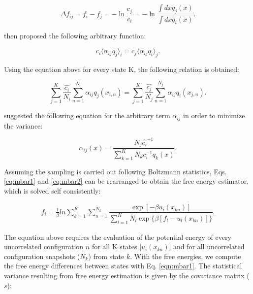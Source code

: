 \begin{equation}
\Delta f_{ij} = f_{i} - f_{j} = - \ln \frac{c_{j}}{c_{i}}  = -\ln \frac{\int dx q_{j}(x)}{\int dx q_{i}(x)} .
\label{eqn:mbar1}
\end{equation}

 then proposed the following arbitrary function:

\begin{equation}
c_{i} \langle \alpha _{ij} q_{j} \rangle _{i}  =  c_{j} \langle \alpha _{ij} q_{i} \rangle _{j} .
\end{equation}

Using the equation above for every state  K, the following relation is obtained:

\begin{equation}
\label{eq:mbar1}
\sum_{j=1}^{K} \frac{\hat{c_{i}}}{N_{i}} \sum_{n=1}^{N_{i}} \alpha _{ij} q_{j} (x_{i,n}) =  \sum_{j=1}^{K} \frac{\hat{c_{j}}}{N_{j}} \sum_{n=1}^{N_{j}} \alpha _{ij} q_{i} (x_{j,n}) .
\end{equation}

 suggested the following equation for the arbitrary term $\alpha _{ij}$ in order to minimize the variance:

\begin{equation}
\label{eq:mbar2}
\alpha _{ij} (x) = \frac{N_{j} \hat{c_{i}} ^{-1}}{\sum_{k=1}^{K} N_{k} c_{i} ^{-1} q_{k}(x)} .
\end{equation}

Assuming the sampling is carried out following Boltzmann statistics, Eqs. \eqref{eq:mbar1} and \eqref{eq:mbar2} can be rearranged to obtain the free energy estimator, which is solved self consistently:  

\begin{equation}
\label{eq:mbar}
\begin{aligned}
f_{i} = \frac{1}{\beta}ln \sum_{k=1}^{K} \sum_{n=1}^{N_{k}}
\dfrac{\exp[-\beta u_{i}(x_{kn})]}{\sum_{l=1}^{K} N_{l} \exp \lbrace \beta [f_{l} - u_{l}(x_{kn})] \rbrace} .
\end{aligned}
\end{equation}

The equation above requires the evaluation of the potential energy  of every  uncorrelated configuration $n$ for all K states [$u_{i}(x_{kn})$] and for all uncorrelated configuration snapshots ($N_{k}$) from state $k$. With the free energies, we compute the free energy differences between states with Eq. \ref{eqn:mbar1}. The statistical variance resulting from free energy estimation is given by the covariance matrix ($s$):

